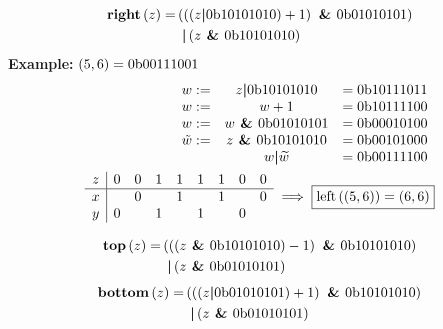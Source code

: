\begin{frame}
    \begin{align}
        \textrm{\textbf{right}}\left(z\right) =& \left(\left(\left(
            z \textrm{\textbf{\textbar }} 0\textrm{b}10101010 \right) + 1 \right) \textrm{\textbf{ \& }} 0\textrm{b}01010101 \right)
            \nonumber \\
            &\;\,\textrm{\textbf{\textbar }} \left( z \textrm{\textbf{ \& }} 0\textrm{b}10101010 \right)
    \end{align}
    \textbf{Example:} $\left( 5, 6 \right) = 0\textrm{b}00111001$
    \begin{align}
        \begin{array}{c c c}
            w :=& z \textrm{\textbf{\textbar }} 0\textrm{b}10101010 &= 0\textrm{b}10111011 \\
            w :=& w + 1 &= 0\textrm{b}10111100 \\
            w :=& w \textrm{\textbf{ \& }} 0\textrm{b}01010101 &= 0\textrm{b}00010100 \\
            \tilde{w} :=& z \textrm{\textbf{ \& }} 0\textrm{b}10101010 &= 0\textrm{b}00101000 \\
            & w \textrm{\textbf{\textbar }} \widetilde{w} &= 0\textrm{b}00111100
        \end{array} \\
        \begin{array}{c | c c c c c c c c}
            z & 0 & 0 & 1 & 1 & 1 & 1 & 0 & 0 \\
            \hline
            x & & 0 & & 1 & & 1 & & 0 \\
            y & 0 & & 1 & & 1 & & 0 \\
        \end{array}
        \implies \boxed{\textrm{left}\left(\left(5, 6\right)\right) =
        \left(6, 6\right)}
    \end{align}
\end{frame}

\begin{frame}
    \begin{align}
        \textrm{\textbf{top}}\left(z\right) =& \left(\left(\left(z \textrm{\textbf{ \& }}
        0\textrm{b}10101010 \right) -1 \right) \textrm{\textbf{ \& }} 0\textrm{b}10101010 \right)
        \nonumber \\
        &\;\,\textrm{\textbf{\textbar }} \left( z \textrm{\textbf{ \& }}
        0\textrm{b}01010101 \right)
    \end{align}
    \begin{align}
        \textrm{\textbf{bottom}}\left(z\right) =& \left(\left(\left(z \textrm{\textbf{\textbar }}
        0\textrm{b}01010101 \right) +1 \right) \textrm{\textbf{ \& }} 0\textrm{b}10101010 \right)
        \nonumber \\
        &\;\,\textrm{\textbf{\textbar }} \left( z \textrm{\textbf{ \& }}
        0\textrm{b}01010101 \right)
    \end{align}
\end{frame}
